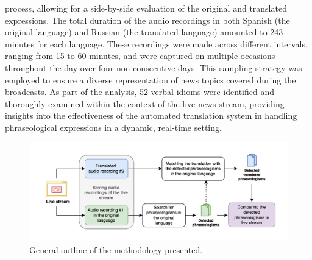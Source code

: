 \begin{enumerate}
  process, allowing for a side-by-side evaluation of the original and
  translated expressions. The total duration of the audio recordings in
  both Spanish (the original language) and Russian (the translated
  language) amounted to 243 minutes for each language. These recordings
  were made across different intervals, ranging from 15 to 60 minutes,
  and were captured on multiple occasions throughout the day over four
  non-consecutive days. This sampling strategy was employed to ensure a
  diverse representation of news topics covered during the broadcasts.
  As part of the analysis, 52 verbal idioms were identified and
  thoroughly examined within the context of the live news stream,
  providing insights into the effectiveness of the automated translation
  system in handling phraseological expressions in a dynamic, real-time
  setting.
\end{enumerate}

\begin{figure}[htpb]
  \centering
  \begin{minipage}{\textwidth}
  \caption{General outline of the methodology presented.}
  \label{fig-02}
  \includegraphics[width=\textwidth]{image2.png}
  \end{minipage}
\end{figure}



